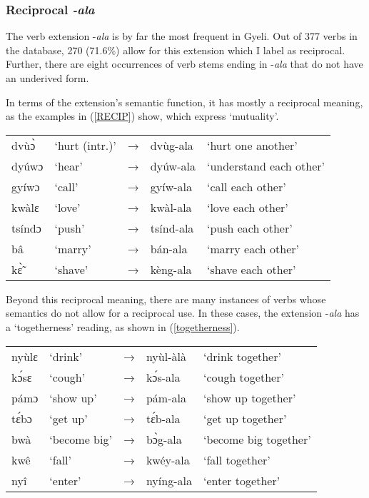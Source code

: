 \subsubsection{Reciprocal \textit{-ala}}
\label{sec:REC}

The verb extension -{\itshape ala} is by far the most frequent in Gyeli. Out of 377 verbs in the database, 270 (71.6\%) allow for this extension which I label as reciprocal. Further, there are eight occurrences of verb stems ending in -{\itshape ala} that do not have an underived form.

In terms of the extension's semantic function, it has mostly a reciprocal meaning, as the examples in (\ref{RECIP}) show, which express `mutuality'.


\begin{exe} \ex \label{RECIP}
\begin{tabular}{lllll}
dvùɔ̀ & `hurt (intr.)' & → & dvùg-ala & `hurt one another' \\
dyúwɔ & `hear' & → & dyúw-ala & `understand each other' \\
gyíwɔ & `call' & → & gyíw-ala & `call each other' \\
kwàlɛ & `love' & → & kwàl-ala & `love each other' \\
tsíndɔ & `push' & → & tsínd-ala & `push each other' \\
bâ & `marry' & → & bán-ala & `marry each other' \\
kɛ̃̀ & `shave' & → &  kèng-ala & `shave each other' \\
\end{tabular}
\end{exe} 


Beyond this reciprocal meaning, there are many instances of verbs whose semantics do not allow for a reciprocal use. In these cases, the extension -{\itshape ala} has a `togetherness' reading, as shown in (\ref{togetherness}).

\begin{exe} \ex \label{togetherness}
\begin{tabular}{lllll}
nyùlɛ & `drink' & → & nyùl-àlà & `drink together' \\
kɔ́sɛ & `cough' & → & kɔ́s-ala & `cough together' \\
pámɔ & `show up' & → & pám-ala & `show up together' \\
tɛ́bɔ & `get up' & → & tɛ́b-ala & `get up together' \\
bwà & `become big' & → & bɔ̀g-ala & `become big together' \\
kwê & `fall' & → & kwéy-ala & `fall together' \\
nyî & `enter' &  → & nyíng-ala & `enter together' \\
\end{tabular}
\end{exe} 

